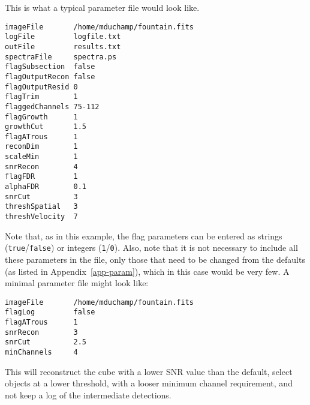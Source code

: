 %
%
%
%
\label{app-input}

This is what a typical parameter file would look like.

\begin{verbatim}
imageFile       /home/mduchamp/fountain.fits
logFile         logfile.txt
outFile         results.txt
spectraFile     spectra.ps
flagSubsection  false
flagOutputRecon false
flagOutputResid 0
flagTrim        1
flaggedChannels 75-112
flagGrowth      1
growthCut       1.5
flagATrous      1
reconDim        1          
scaleMin        1
snrRecon        4
flagFDR         1
alphaFDR        0.1
snrCut          3
threshSpatial   3
threshVelocity  7
\end{verbatim}

Note that, as in this example, the flag parameters can be entered as
strings (\texttt{true}/\texttt{false}) or integers
(\texttt{1}/\texttt{0}). Also, note that it is not necessary to
include all these parameters in the file, only those that need to be
changed from the defaults (as listed in Appendix~\ref{app-param}),
which in this case would be very few. A minimal parameter file might
look like:
\begin{verbatim}
imageFile       /home/mduchamp/fountain.fits
flagLog         false
flagATrous      1
snrRecon        3
snrCut          2.5
minChannels     4
\end{verbatim}
This will reconstruct the cube with a lower SNR value than the
default, select objects at a lower threshold,  with a looser minimum
channel requirement, and not keep a log of the intermediate
detections. 

